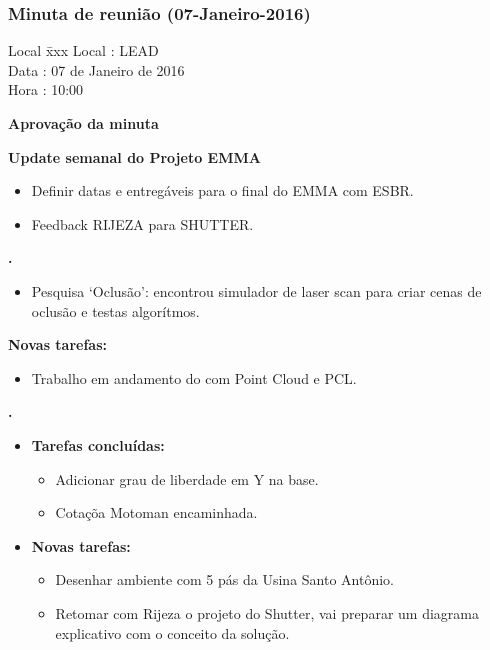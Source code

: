 \subsubsection{Minuta de reunião (07-Janeiro-2016)}

\begin{tabbing}
  Local \= xxx \kill
  Local \> : LEAD \\
  Data  \> : 07 de Janeiro de 2016 \\
  Hora  \> : 10:00
\end{tabbing} 


\textbf{Aprovação da minuta}

\textbf{Update semanal do Projeto EMMA}

\begin{itemize}
			\item Definir datas e entregáveis para o final do EMMA com ESBR.
			\item Feedback RIJEZA para SHUTTER.
			\end{itemize}
   									
						
\textbf{\gabriel.} 
	\begin{itemize}
			\item Pesquisa ‘Oclusão’: encontrou simulador de laser scan para criar cenas
			de oclusão e testas algorítmos.
			\end{itemize}
		
		\item \textbf{Novas tarefas:}
			\begin{itemize} 
				\item Trabalho em andamento do com Point Cloud e PCL.
			\end{itemize}

					
   \textbf{.} 
	\begin{itemize}
		\item \textbf{Tarefas concluídas:}
			\begin{itemize}    
			    \item Adicionar grau de liberdade em Y na base.
			    \item Cotaçõa Motoman encaminhada.
				
			\end{itemize}
		
		\item \textbf{Novas tarefas:}
			\begin{itemize} 
			    \item Desenhar ambiente com 5 pás da Usina Santo Antônio.
			    \item Retomar com Rijeza o projeto do Shutter, vai preparar um diagrama
			    explicativo com o conceito da solução.
			\end{itemize}
	\end{itemize}

